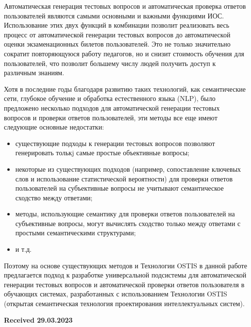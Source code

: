 \documentclass{article}
\begin{document}
\begin{multicols}{2}
Автоматическая генерация тестовых вопросов и автоматическая проверка ответов пользователей являются самыми основными и важными функциями ИОС. Использование этих двух функций в комбинации позволит реализовать весь процесс от автоматической генерации тестовых вопросов до автоматической оценки экзаменационных билетов пользователей. Это не только значительно сократит повторяющуюся работу педагогов, но и снизит стоимость обучения для пользователей, что позволит большему числу людей получить доступ к различным знаниям.

Хотя в последние годы благодаря развитию таких технологий, как семантические сети, глубокое обучение и обработка естественного языка (NLP), было предложено несколько
подходов для автоматической генерации тестовых вопросов и проверки ответов пользователей, эти методы все еще имеют следующие основные недостатки:
\begin{itemize}
    \item существующие подходы к генерации тестовых вопросов позволяют генерировать толькj самые простые объективные вопросы;
    \item  некоторые из существующих подходов (например, сопоставление ключевых слов и использование статистической вероятности) для проверки ответов пользователей на субъективные вопросы не учитывают семантическое сходство между ответами;
    \item методы, использующие семантику для проверки ответов пользователей на субъективные вопросы, могут вычислять сходство только между ответами с простыми семантическими структурами;
    \item и т.д.
\end{itemize}

Поэтому на основе существующих методов и Технологии OSTIS в данной работе предлагается подход к разработке универсальной подсистемы для автоматической генерации тестовых вопросов и автоматической проверки ответов пользователя в обучающих системах, разработанных с использованием Технологии OSTIS (открытая семантическая технология проектирования интеллектуальных систем).

\vspace{0.3cm}
\hspace{5cm}\textbf{Received 29.03.2023}
\end{multicols}
\end{document}
